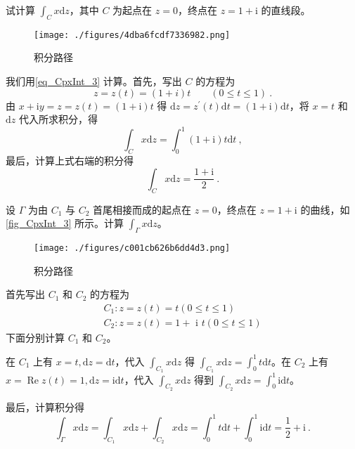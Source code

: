 \begin{example}{} \label{ex_CpxInt_1}
试计算 $\displaystyle \int_{C} x \mathrm{d} z$，其中 $C$ 为起点在 $z = 0$，终点在 $z =1+\mathrm i$ 的直线段。
\begin{figure}[ht]
\centering
\texttt{[image: ./figures/4dba6fcdf7336982.png]}
\caption{积分路径} \label{fig_CpxInt_2}
\end{figure}

我们用\autoref{eq_CpxInt_3} 计算。首先，写出 $C$ 的方程为
\begin{equation}
z=z(t)=(1+i) t \qquad (0 \leqslant t \leqslant 1)~.
\end{equation}
由 $x+\mathrm{i} y=z=z(t)=(1+\mathrm{i}) t$ 得 $\mathrm{d} z=z^{\prime}(t) \mathrm{d} t=(1+\mathrm{i}) \mathrm{d} t$，将 $x=t$ 和 $\mathrm dz$ 代入所求积分，得
\begin{equation}
\int_{C} x \mathrm{d} z=\int_{0}^{1}(1+\mathrm{i}) t \mathrm{d} t~,
\end{equation}
最后，计算上式右端的积分得
\begin{equation}
\int_{C} x \mathrm{d} z=\frac{1+\mathrm{i}}{2}~.
\end{equation}
\end{example}

\begin{example}{} \label{ex_CpxInt_2}
设 $\Gamma$ 为由 $C_1$ 与 $C_2$ 首尾相接而成的起点在 $z=0$，终点在 $ z =1+ \mathrm i $ 的曲线，如\autoref{fig_CpxInt_3} 所示。计算 $\displaystyle \int_{\Gamma} x \mathrm{d}z$。
\begin{figure}[ht]
\centering
\texttt{[image: ./figures/c001cb626b6dd4d3.png]}
\caption{积分路径} \label{fig_CpxInt_3}
\end{figure}

首先写出 $C_1$ 和 $C_2$ 的方程为
\begin{equation}
\begin{array}{l}C_{1}: z=z(t)=t(0 \leqslant t \leqslant 1) \\ C_{2}: z=z(t)=1+\text { i }t(0 \leqslant t \leqslant 1)\end{array}
\end{equation}
下面分别计算 $C_1$ 和 $C_2$。

在 $C_1$ 上有 $x=t, \mathrm{d} z=\mathrm{d} t$，代入 $\displaystyle \int_{C_{1}} x \mathrm{d} z$ 得 $\displaystyle \int_{C_{1}} x \mathrm{d} z=\int_{0}^{1} t \mathrm{d} t$。在 $C_2$ 上有 $\displaystyle x=\operatorname{Re} z(t)=1, \mathrm{d} z=\mathrm{id} t$，代入 $\displaystyle \int_{C_{2}} x \mathrm{d} z$ 得到 $\displaystyle \int_{C_{2}} x \mathrm{d} z=\int_{0}^{1} \mathrm{id} t$。

最后，计算积分得
\begin{equation}
\int_{\Gamma} x \mathrm{d} z=\int_{C_{1}} x \mathrm{d} z+\int_{C_{2}} x \mathrm{d} z=\int_{0}^{1} t \mathrm{d} t+\int_{0}^{1} \mathrm{i} \mathrm{d} t=\frac{1}{2}+\mathrm{i}~.
\end{equation}
\end{example}

